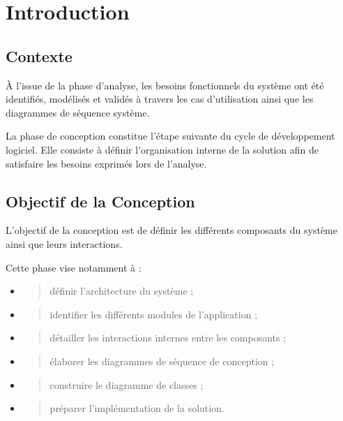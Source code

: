\hypertarget{chapitre-1-introduction}{%
\chapter{Introduction}\label{chapitre-1-introduction}}

\hypertarget{contexte}{%
\section{Contexte}\label{contexte}}

À l'issue de la phase d'analyse, les besoins fonctionnels du système ont
été identifiés, modélisés et validés à travers les cas d'utilisation
ainsi que les diagrammes de séquence système.

La phase de conception constitue l'étape suivante du cycle de
développement logiciel. Elle consiste à définir l'organisation interne
de la solution afin de satisfaire les besoins exprimés lors de
l'analyse.

\hypertarget{objectif-de-la-conception}{%
\section{Objectif de la Conception}\label{objectif-de-la-conception}}

L'objectif de la conception est de définir les différents composants du
système ainsi que leurs interactions.

Cette phase vise notamment à :

\begin{itemize}
\item
  \begin{quote}
  définir l'architecture du système ;
  \end{quote}
\item
  \begin{quote}
  identifier les différents modules de l'application ;
  \end{quote}
\item
  \begin{quote}
  détailler les interactions internes entre les composants ;
  \end{quote}
\item
  \begin{quote}
  élaborer les diagrammes de séquence de conception ;
  \end{quote}
\item
  \begin{quote}
  construire le diagramme de classes ;
  \end{quote}
\item
  \begin{quote}
  préparer l'implémentation de la solution.
  \end{quote}
\end{itemize}

